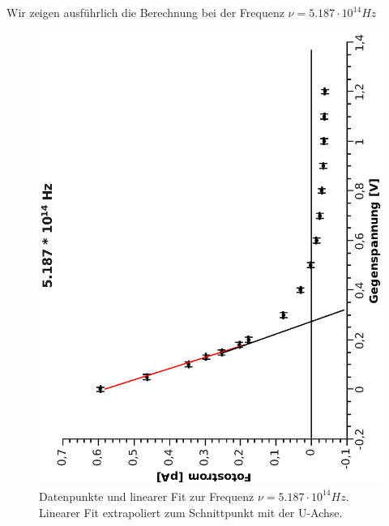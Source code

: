 \documentclass[12pt,a4paper,twopage]{article}
\begin{document}
Wir zeigen ausführlich die Berechnung bei der Frequenz $\nu=5.187 \cdot 10^{14}\si{Hz}$
\begin{center}
\begin{figure}[H]
\includegraphics[scale=0.7, angle=-90]{5187.eps}
\caption{Datenpunkte und linearer Fit zur Frequenz $\nu=5.187 \cdot 10^{14}\si{Hz}$. Linearer Fit extrapoliert zum Schnittpunkt mit der U-Achse.}
\end{figure}
\end{center}
\end{document}
